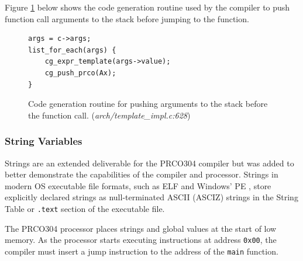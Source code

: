 \documentclass[11pt,a4paper]{report}
\newcommand{\scname}{PRCO304}
\begin{document}
Figure \ref{fig:compiler_cg_vars_args} below shows the code generation routine used by the compiler to push function call arguments to the stack before jumping to the function.

\begin{figure}[H]
\centering 
\begin{minipage}{0.4\textwidth}
\begin{verbatim}
args = c->args;
list_for_each(args) {
    cg_expr_template(args->value);
    cg_push_prco(Ax);
}
\end{verbatim}
\end{minipage}
\caption{Code generation routine for pushing arguments to the stack before the function call. (\textit{arch/template\_impl.c:628})}
\label{fig:compiler_cg_vars_args}
\end{figure}


\subsubsection*{String Variables}
Strings are an extended deliverable for the \scname{} compiler but was added to better demonstrate the capabilities of the compiler and processor. Strings in modern OS executable file formats, such as ELF \cite{elf_standard} and Windows' PE \cite {winpe_standard}, store explicitly declared strings as null-terminated ASCII (ASCIZ) strings in the String Table or \verb|.text| section of the executable file.

The \scname{} processor places strings and global values at the start of low memory. As the processor starts executing instructions at address \verb|0x00|, the compiler must insert a jump instruction to the address of the \verb|main| function.
\end{document}
